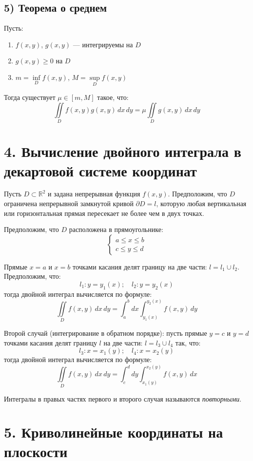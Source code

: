 \documentclass[17pt,a4paper]{extreport}
\begin{document}
\subsection*{5) Теорема о среднем}

Пусть:
\begin{enumerate}
\item $f(x,y)$, $g(x,y)$ --- интегрируемы на $D$
\item $g(x,y) \geq 0$ на $D$
\item $m = \inf\limits_D f(x,y)$, $M = \sup\limits_D f(x,y)$
\end{enumerate}

Тогда существует $\mu \in [m, M]$ такое, что:
\[
\iint\limits_D f(x,y) g(x,y)\,dx\,dy = \mu \iint\limits_D g(x,y)\,dx\,dy
\]

\newpage

\section{4. Вычисление двойного интеграла в декартовой системе координат}

Пусть $D \subset \mathbb{R}^2$ и задана непрерывная функция $f(x,y)$. Предположим, что $D$ ограничена непрерывной замкнутой кривой $\partial D = l$, которую любая вертикальная или горизонтальная прямая пересекает не более чем в двух точках.

Предположим, что $D$ расположена в прямоугольнике:
\[
\begin{cases}
a \leq x \leq b \\
c \leq y \leq d
\end{cases}
\]

Прямые $x = a$ и $x = b$ точками касания делят границу на две части: $l = l_1 \cup l_2$. Предположим, что:
\[
l_1: y = y_1(x); \quad l_2: y = y_2(x)
\]
тогда двойной интеграл вычисляется по формуле:
\[
\iint\limits_D f(x,y)\,dx\,dy = \int_a^b dx \int_{y_1(x)}^{y_2(x)} f(x,y)\,dy
\]

Второй случай (интегрирование в обратном порядке): пусть прямые $y = c$ и $y = d$ точками касания делят границу $l$ на две части: $l = l_3 \cup l_4$ так, что:
\[
l_3: x = x_1(y); \quad l_4: x = x_2(y)
\]
тогда двойной интеграл вычисляется по формуле:
\[
\iint\limits_D f(x,y)\,dx\,dy = \int_c^d dy \int_{x_1(y)}^{x_2(y)} f(x,y)\,dx
\]

Интегралы в правых частях первого и второго случая называются \emph{повторными}.

\section{5. Криволинейные координаты на плоскости}
\end{document}
